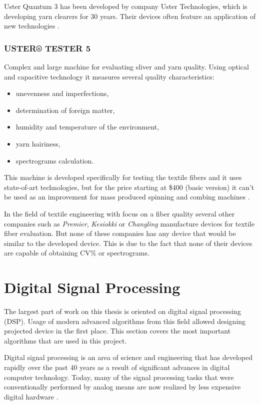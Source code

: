 \documentclass[twoside]{ctuthesis}
\theoremstyle{plain}
\theoremstyle{definition}
\theoremstyle{note}
\begin{document}
Uster Quantum 3 has been developed by company Uster Technologies, which is developing yarn clearers for 30 years. Their devices often feature an application of new technologies \cite{cite:UsterQuantum}.

\subsubsection{USTER® TESTER 5}  
Complex and large machine for evaluating sliver and yarn quality. Using optical and capacitive technology it measures several quality characteristics:
\begin{itemize}
	\setlength{\itemsep}{5pt}
	\item unevenness and imperfections,
	\item determination of foreign matter,
	\item humidity and temperature of the environment,
	\item yarn hairiness,
	\item spectrograms calculation.
\end{itemize}
This machine is developed specifically for testing the textile fibers and it uses state-of-art technologies, but for the price starting at \$400 (basic version) it can't be used as an improvement for mass produced spinning and combing machines \cite{cite:UsterTester}.  

In the field of textile engineering with focus on a fiber quality several other companies such as \textit{Premier}, \textit{Kesiokki} or \textit{Changling} manufacture devices for textile fiber evaluation. But none of these companies has any device that would be similar to the developed device. This is due to the fact that none of their devices are capable of obtaining CV\% or spectrograms.

\section{Digital Signal Processing}
The largest part of work on this thesis is oriented on digital signal processing (DSP). Usage of modern advanced algorithms from this field allowed designing projected device in the first place. This section covers the most important algorithms that are used in this project.

Digital signal processing is an area of science and engineering that has developed rapidly over the past 40 years as a result of significant advances in digital computer technology. Today, many of the signal processing tasks that were conventionally performed by analog means are now realized by less expensive digital hardware \cite{cite:2}.
\end{document}
